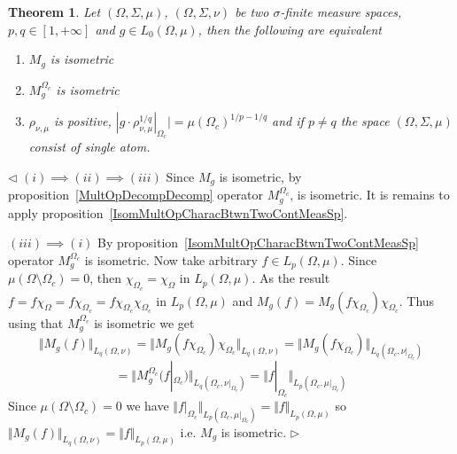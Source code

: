\documentclass[12pt]{article}
\newtheorem{theorem}{Theorem}[subsection]
\newenvironment{proof}{\par $\triangleleft$}{$\triangleright$}
\begin{document}
\begin{theorem}\label{IsomMultOpCharacBtwnTwoMeasSp}
    Let $(\Omega,\Sigma,\mu)$, $(\Omega,\Sigma,\nu)$ be two $\sigma$-finite
    measure spaces, $p,q\in[1,+\infty]$ and $g\in L_0(\Omega,\mu)$, then the
    following are equivalent
    \begin{enumerate}[label = (\roman*)]
        \item $M_g$ is isometric

        \item $M_g^{\Omega_c}$ is isometric

        \item $\rho_{\nu,\mu}$ is positive,
              $|g\cdot \rho_{\nu,\mu}^{1/q}|_{\Omega_c}|
                ={\mu(\Omega_c)}^{1/p-1/q}$
              and if  $p\neq q$ the space $(\Omega,\Sigma,\mu)$ consist
              of single atom.
    \end{enumerate}
\end{theorem}
\begin{proof}
    $(i)\implies (ii)\implies (iii)$ Since $M_g$ is isometric, by
    proposition~\ref{MultOpDecompDecomp} operator $M_g^{\Omega_c}$, is
    isometric. It is remains to apply
    proposition~\ref{IsomMultOpCharacBtwnTwoContMeasSp}.

    $(iii)\implies (i)$ By proposition~\ref{IsomMultOpCharacBtwnTwoContMeasSp}
    operator $M_g^{\Omega_c}$ is isometric. Now take arbitrary
    $f\in L_p(\Omega,\mu)$. Since $\mu(\Omega\setminus\Omega_c)=0$,
    then $\chi_{\Omega_c}=\chi_{\Omega}$ in $L_p(\Omega,\mu)$. As the
    result $f=f\chi_{\Omega}=f\chi_{\Omega_c}=f\chi_{\Omega_c}\chi_{\Omega_c}$
    in $L_p(\Omega,\mu)$ and $M_g(f)=M_g(f\chi_{\Omega_c})\chi_{\Omega_c}$.
    Thus using that $M_g^{\Omega_c}$ is isometric we get
    $$
        \Vert M_g(f)\Vert_{L_q(\Omega,\nu)} =\Vert
        M_g(f\chi_{\Omega_c})\chi_{\Omega_c}\Vert_{L_q(\Omega,\nu)} =\Vert
        M_g(f\chi_{\Omega_c})\Vert_{L_q(\Omega_c,\nu|_{\Omega_c})}
    $$
    $$
        =\Vert
        M_g^{\Omega_c}(f|_{\Omega_c})\Vert_{L_q(\Omega_c,\nu|_{\Omega_c})}
        =\Vert f|_{\Omega_c}\Vert_{L_p(\Omega_c,\mu|_{\Omega_c})}
    $$
    Since $\mu(\Omega\setminus\Omega_c)=0$ we have
    $\Vert f|_{\Omega_c}\Vert_{L_p(\Omega_c,\mu|_{\Omega_c})}
        =\Vert f\Vert_{L_p(\Omega,\mu)}$ so $\Vert M_g(f)\Vert_{L_q(\Omega,\nu)}
        =\Vert f\Vert_{L_p(\Omega,\mu)}$ i.e.  $M_g$ is isometric.
\end{proof}
\end{document}
